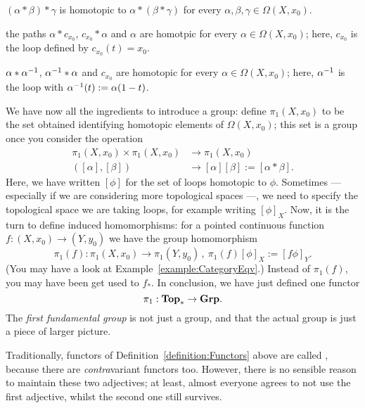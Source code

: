 \begin{example}
\begin{tcbitem}
\item \((\alpha \ast \beta) \ast \gamma\) is homotopic to \(\alpha \ast (\beta \ast \gamma)\) for every \(\alpha, \beta, \gamma \in \Omega(X, x_0)\).
\item the paths \(\alpha \ast c_{x_0}\), \(c_{x_0} \ast \alpha\) and \(\alpha\) are homotpic for every \(\alpha \in \Omega(X, x_0)\); here, \(c_{x_0}\) is the loop defined by \(c_{x_0}(t) = x_0\).
\item \(\alpha \ast \alpha^{-1}\), \(\alpha^{-1} \ast \alpha\) and \(c_{x_0}\) are homotopic for every \(\alpha \in \Omega(X, x_0)\); here, \(\alpha^{-1}\) is the loop with \(\alpha^{-1} (t) := \alpha (1-t)\).
\end{tcbitem}
We have now all the ingredients to introduce a group: define \(\pi_1(X, x_0)\) to be the set obtained identifying homotopic elements of \(\Omega(X, x_0)\); this set is a group once you consider the operation
\[\begin{aligned}
\pi_1(X, x_0) \times \pi_1(X, x_0) &\to \pi_1(X, x_0) \\
([\alpha], [\beta]) &\to [\alpha][\beta] := [\alpha \ast \beta] .
\end{aligned}\]
Here, we have written \([\phi]\) for the set of loops homotopic to \(\phi\). Sometimes --- especially if we are considering more topological spaces ---, we need to specify the topological space we are taking loops, for example writing \([\phi]_X\). Now, it is the turn to define induced homomorphisms: for a pointed continuous function \(f : (X, x_0) \to (Y, y_0)\) we have the group homomorphism
\[\pi_1 (f) : \pi_1(X, x_0) \to \pi_1(Y, y_0)\,, \ \pi_1(f)[\phi]_X := [f \phi]_Y  .\]
(You may have a look at Example~\ref{example:CategoryEqv}.) Instead of \(\pi_1(f)\), you may have been get used to \(f_\ast\). In conclusion, we have just defined one functor
\[\pi_1 : \mathbf{Top}_\ast \to \mathbf{Grp} .\]
The {\em first fundamental group} is not just a group, and that the actual group is just a piece of larger picture.
\end{example}

Traditionally, functors of Definition~\ref{definition:Functors} above are called , because there are {\em contra}variant functors too. However, there is no sensible reason to maintain these two adjectives; at least, almost everyone agrees to not use the first adjective, whilst the second one still survives.


